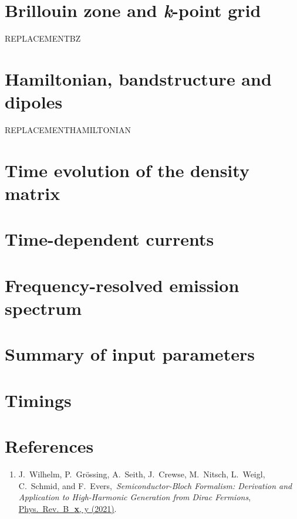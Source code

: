 \documentclass[11pt, a4paper, openany]{scrartcl}
\newcommand{\paper}[4]{\item #1, \,\textit{#2}, \,\href{#3}{#4}.\\[-1.4em]}
\begin{document}
\section{Brillouin zone and \textit{k}-point grid}
REPLACEMENTBZ


\section{Hamiltonian, bandstructure and dipoles}
REPLACEMENTHAMILTONIAN


\section{Time evolution of the density matrix}

\section{Time-dependent currents}

\section{Frequency-resolved emission spectrum}

\section{Summary of input parameters}

\section{Timings}


\section{References}
\begin{enumerate}[leftmargin=*]

\paper{J.~Wilhelm, P.~Grössing, A.~Seith, J.~Crewse, M.~Nitsch, L.~Weigl, C.~Schmid, and F.~Evers}{Semi\-conductor-Bloch Formalism: Derivation and Application to High-Harmonic Generation from Dirac Fermions}{TOBEFILLED}{ 
Phys.~Rev.~B~\,\textbf{x}, y (2021)}
\label{Wilhelm2021}

\end{enumerate}
\end{document}
